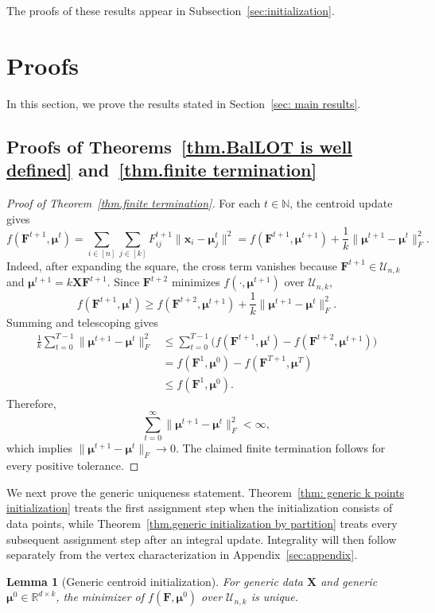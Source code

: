 \documentclass{article}
\theoremstyle{plain}
\newtheorem{lemma}[theorem]{Lemma}
\theoremstyle{definition}
\newcommand{\1}{\mathbf{1}}
\newcommand{\Rdk}{\mathbb{R}^{d\times k}}
\newcommand{\bUnk}{\mathcal{U}_{n,k}}
\newcommand{\bmF}{\bm{F}}
\newcommand{\bmu}{\bm{\mu}}
\begin{document}
The proofs of these results appear in Subsection~\ref{sec:initialization}.


\section{Proofs}
\label{sec: formal statements}

In this section, we prove the results stated in Section~\ref{sec: main results}.

\subsection{Proofs of Theorems~\ref{thm.BalLOT is well defined} and~\ref{thm.finite termination}}
\label{sec: well-defineness}

\begin{proof}[Proof of Theorem~\ref{thm.finite termination}]
For each $t\in\mathbb{N}$, the centroid update gives
\[
f(\bmF^{t+1},\bmu^t)
=\sum_{i\in[n]}\sum_{j\in[k]}F_{ij}^{t+1}\|\bm{x}_i-\bmu_j^t\|^2
=f(\bmF^{t+1},\bmu^{t+1})+\frac{1}{k}\|\bmu^{t+1}-\bmu^t\|_F^2.
\]
Indeed, after expanding the square, the cross term vanishes because $\bmF^{t+1}\in\bUnk$ and $\bmu^{t+1}=k\bm{X}\bmF^{t+1}$.
Since $\bmF^{t+2}$ minimizes $f(\cdot,\bmu^{t+1})$ over $\bUnk$,
\[
f(\bmF^{t+1},\bmu^t)
\geq
f(\bmF^{t+2},\bmu^{t+1})
+\frac{1}{k}\|\bmu^{t+1}-\bmu^t\|_F^2.
\]
Summing and telescoping gives
\begin{align*}
\frac{1}{k}\sum_{t=0}^{T-1}\|\bmu^{t+1}-\bmu^t\|_F^2
&\leq
\sum_{t=0}^{T-1}\big(f(\bmF^{t+1},\bmu^t)-f(\bmF^{t+2},\bmu^{t+1})\big)\\
&=f(\bmF^1,\bmu^0)-f(\bmF^{T+1},\bmu^T)\\[1em]
&\leq f(\bmF^1,\bmu^0).
\end{align*}
Therefore,
\[
\sum_{t=0}^{\infty}\|\bmu^{t+1}-\bmu^t\|_F^2<\infty,
\]
which implies $\|\bmu^{t+1}-\bmu^t\|_F\to0$.
The claimed finite termination follows for every positive tolerance.
\end{proof}

We next prove the generic uniqueness statement.
Theorem~\ref{thm: generic k points initialization} treats the first assignment step when the initialization consists of data points, while Theorem~\ref{thm.generic initialization by partition} treats every subsequent assignment step after an integral update.
Integrality will then follow separately from the vertex characterization in Appendix~\ref{sec:appendix}.

\begin{lemma}[Generic centroid initialization]
\label{lem: generic centroid initialization}
For generic data $\bm{X}$ and generic $\bmu^0\in\Rdk$, the minimizer of $f(\bmF,\bmu^0)$ over $\bUnk$ is unique.
\end{lemma}
\end{document}
